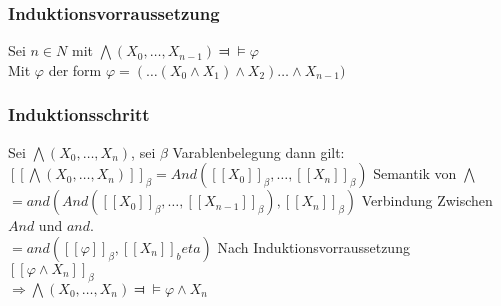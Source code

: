 \subsubsection*{Induktionsvorraussetzung}
Sei $n \in N $ mit $\bigwedge (X_0, \ldots , X_{n-1}) \Dashv \vDash \varphi $\\
Mit $\varphi$ der form $\varphi=( \ldots (X_0 \wedge X_1) \wedge X_2 ) \ldots \wedge X_{n-1})$

\subsubsection*{Induktionsschritt} 
Sei $\bigwedge (X_0, \ldots , X_{n})$, sei $\beta$ Varablenbelegung dann gilt:\\
$[[\bigwedge (X_0, \ldots , X_{n})]]_\beta = And([[X_0]]_\beta, \ldots , [[X_n]]_\beta)$ Semantik von $\bigwedge$\\
$= and(And([[X_0]]_\beta, \ldots , [[X_{n-1}]]_\beta ), [[X_n]]_\beta)$ Verbindung Zwischen $And$ und $and$. \\
$= and([[\varphi]]_\beta, [[X_n]]_beta)$ Nach Induktionsvorraussetzung \\
$[[\varphi \wedge X_n]]_\beta$\\
$\Rightarrow \bigwedge (X_0, \ldots , X_{n}) \Dashv \vDash \varphi \wedge X_n $